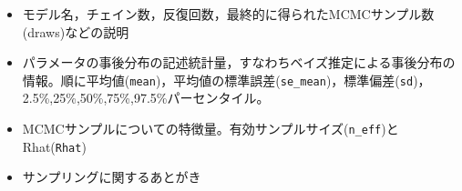 \begin{itemize}
	\item モデル名，チェイン数，反復回数，最終的に得られたMCMCサンプル数(draws)などの説明
	\item パラメータの事後分布の記述統計量，すなわちベイズ推定による事後分布の情報。順に平均値(\verb|mean|)，平均値の標準誤差(\verb|se_mean|)，標準偏差(\verb|sd|)，2.5\%,25\%,50\%,75\%,97.5\%パーセンタイル。
	\item MCMCサンプルについての特徴量。有効サンプルサイズ(\verb|n_eff|)とRhat(\verb|Rhat|)
	\item サンプリングに関するあとがき
\end{itemize}
